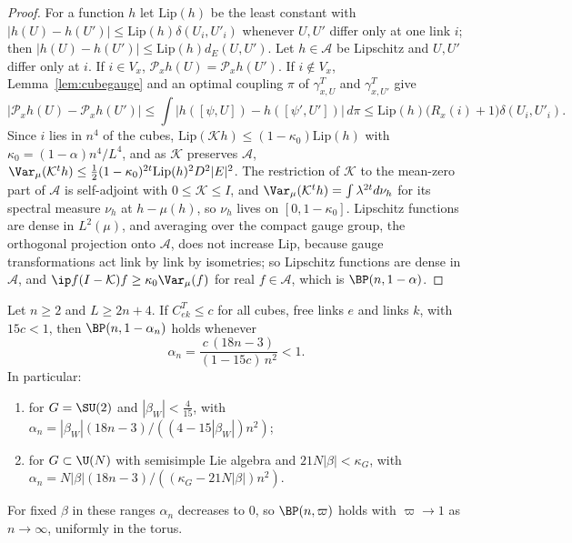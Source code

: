 \begin{proof}
For a function $h$ let $\mathrm{Lip}(h)$ be the least constant with
$|h(U)-h(U')|\le\mathrm{Lip}(h)\delta(U_i,U'_i)$ whenever $U,U'$ differ only at
one link $i$; then $|h(U)-h(U')|\le\mathrm{Lip}(h)d_E(U,U')$. Let $h\in\mathcal A$
be Lipschitz and $U,U'$ differ only at $i$. If $i\in V_x$,
$\mathcal P_xh(U)=\mathcal P_xh(U')$. If $i\notin V_x$, Lemma~\ref{lem:cubegauge}
and an optimal coupling $\pi$ of $\gamma^T_{x,U}$ and $\gamma^T_{x,U'}$ give
\[
|\mathcal P_xh(U)-\mathcal P_xh(U')|\le\int|h([\psi,U])-h([\psi',U'])|\,d\pi
\le\mathrm{Lip}(h)\bigl(R_x(i)+1\bigr)\delta(U_i,U'_i).
\]
Since $i$ lies in $n^4$ of the cubes, $\mathrm{Lip}(\mathcal Kh)\le(1-\kappa_0)
\mathrm{Lip}(h)$ with $\kappa_0=(1-\alpha)n^4/L^4$, and as $\mathcal K$
preserves $\mathcal A$, $\Var_\mu(\mathcal K^th)\le\frac12(1-\kappa_0)^{2t}
\mathrm{Lip}(h)^2D^2|E|^2$. The restriction of $\mathcal K$ to the mean-zero
part of $\mathcal A$ is self-adjoint with $0\le\mathcal K\le I$, and
$\Var_\mu(\mathcal K^th)=\int\lambda^{2t}d\nu_h$ for its spectral measure $\nu_h$
at $h-\mu(h)$, so $\nu_h$ lives on $[0,1-\kappa_0]$. Lipschitz functions are
dense in $L^2(\mu)$, and averaging over the compact gauge group, the
orthogonal projection onto $\mathcal A$, does not increase $\mathrm{Lip}$,
because gauge transformations act link by link by isometries; so Lipschitz
functions are dense in $\mathcal A$, and $\ip f{(I-\mathcal K)f}\ge\kappa_0
\Var_\mu(f)$ for real $f\in\mathcal A$, which is $\BP(n,1-\alpha)$.
\end{proof}

\begin{theorem}\label{thm:bpstrong}
Let $n\ge2$ and $L\ge2n+4$. If $C^T_{ek}\le c$ for all cubes, free links $e$
and links $k$, with $15c<1$, then $\BP(n,1-\alpha_n)$ holds whenever
\[
\alpha_n=\frac{c\,(18n-3)}{(1-15c)\,n^2}<1 .
\]
In particular:
\begin{enumerate}[label=\textup{(\roman*)},leftmargin=*]
\item for $G=\SU(2)$ and $|\beta_W|<\frac4{15}$, with $\alpha_n=|\beta_W|(18n-3)/
((4-15|\beta_W|)n^2)$;
\item for $G\subset\U(N)$ with semisimple Lie algebra and $21N|\beta|<\kappa_G$,
with $\alpha_n=N|\beta|(18n-3)/((\kappa_G-21N|\beta|)n^2)$.
\end{enumerate}
For fixed $\beta$ in these ranges $\alpha_n$ decreases to $0$, so $\BP(n,\varpi)$
holds with $\varpi\to1$ as $n\to\infty$, uniformly in the torus.
\end{theorem}

